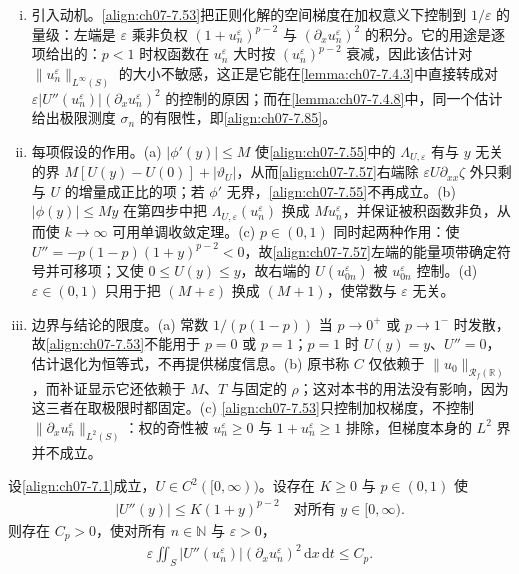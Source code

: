 ﻿\documentclass[../../main.tex]{subfiles}%
\begin{document}
\begin{remark}\label{remark:ch07-7.4.2截断}
\begin{enumerate}[(i)]
\item 引入动机。\eqref{align:ch07-7.53}把正则化解的空间梯度在加权意义下控制到 $1/\varepsilon$ 的量级：左端是 $\varepsilon$ 乘非负权 $(1+u_n^\varepsilon)^{p-2}$ 与 $(\partial_xu_n^\varepsilon)^2$ 的积分。它的用途是逐项给出的：$p<1$ 时权函数在 $u_n^\varepsilon$ 大时按 $(u_n^\varepsilon)^{p-2}$ 衰减，因此该估计对 $\|u_n^\varepsilon\|_{L^\infty(S)}$ 的大小不敏感，这正是它能在\cref{lemma:ch07-7.4.3}中直接转成对 $\varepsilon|U''(u_n^\varepsilon)|(\partial_xu_n^\varepsilon)^2$ 的控制的原因；而在\cref{lemma:ch07-7.4.8}中，同一个估计给出极限测度 $\sigma_n$ 的有限性，即\eqref{align:ch07-7.85}。
\item 每项假设的作用。(a) $|\phi'(y)|\leqslant M$ 使\eqref{align:ch07-7.55}中的 $\Lambda_{U,\varepsilon}$ 有与 $y$ 无关的界 $M[U(y)-U(0)]+|\vartheta_U|$，从而\eqref{align:ch07-7.57}右端除 $\varepsilon U\partial_{xx}\zeta$ 外只剩与 $U$ 的增量成正比的项；若 $\phi'$ 无界，\eqref{align:ch07-7.55}不再成立。(b) $|\phi(y)|\leqslant My$ 在第四步中把 $\Lambda_{U,\varepsilon}(u_n^\varepsilon)$ 换成 $Mu_n^\varepsilon$，并保证被积函数非负，从而使 $k\to\infty$ 可用单调收敛定理。(c) $p\in(0,1)$ 同时起两种作用：使 $U''=-p(1-p)(1+y)^{p-2}<0$，故\eqref{align:ch07-7.57}左端的能量项带确定符号并可移项；又使 $0\leqslant U(y)\leqslant y$，故右端的 $U(u_{0n}^\varepsilon)$ 被 $u_{0n}^\varepsilon$ 控制。(d) $\varepsilon\in(0,1)$ 只用于把 $(M+\varepsilon)$ 换成 $(M+1)$，使常数与 $\varepsilon$ 无关。
\item 边界与结论的限度。(a) 常数 $1/(p(1-p))$ 当 $p\to0^+$ 或 $p\to1^-$ 时发散，故\eqref{align:ch07-7.53}不能用于 $p=0$ 或 $p=1$；$p=1$ 时 $U(y)=y$、$U''=0$，估计退化为恒等式，不再提供梯度信息。(b) 原书称 $C$ 仅依赖于 $\|u_0\|_{\mathscr{R}_f(\mathbb{R})}$，而补证显示它还依赖于 $M$、$T$ 与固定的 $\rho$；这对本书的用法没有影响，因为这三者在取极限时都固定。(c) \eqref{align:ch07-7.53}只控制加权梯度，不控制 $\|\partial_xu_n^\varepsilon\|_{L^2(S)}$：权的奇性被 $u_n^\varepsilon\geqslant0$ 与 $1+u_n^\varepsilon\geqslant1$ 排除，但梯度本身的 $L^2$ 界并不成立。
\end{enumerate}
\end{remark}

\begin{lemma}\label{lemma:ch07-7.4.3}
设\eqref{align:ch07-7.1}成立，$U\in C^2([0,\infty))$。设存在 $K\geqslant0$ 与 $p\in(0,1)$ 使
\begin{align}
|U''(y)|\leqslant K(1+y)^{p-2}\quad\text{对所有 }y\in[0,\infty). \label{align:ch07-7.58}
\end{align}
则存在 $C_p>0$，使对所有 $n\in\mathbb{N}$ 与 $\varepsilon>0$，
\begin{align}
\varepsilon\iint_S|U''(u_n^\varepsilon)|(\partial_xu_n^\varepsilon)^2\,\mathrm{d}x\,\mathrm{d}t\leqslant C_p. \label{align:ch07-7.59}
\end{align}
\end{lemma}
\end{document}
